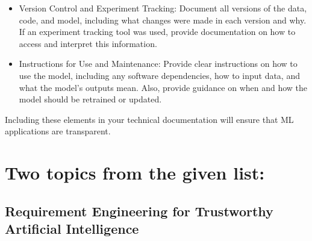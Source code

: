 \documentclass[a4paper,11pt]{article}
\begin{document}
\begin{itemize}
\item Version Control and Experiment Tracking: Document all versions of the data, code, and model, including what changes were made in each version and why. If an experiment tracking tool was used, provide documentation on how to access and interpret this information.

\item Instructions for Use and Maintenance: Provide clear instructions on how to use the model, including any software dependencies, how to input data, and what the model's outputs mean. Also, provide guidance on when and how the model should be retrained or updated.

\end{itemize}
Including these elements in your technical documentation will ensure that ML applications are transparent.

\section{Two topics from the given list:}

\subsection{Requirement Engineering for Trustworthy Artificial Intelligence}
\end{document}
